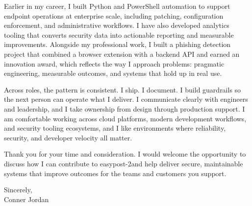\documentclass[letterpaper,11pt]{article}
\newcommand{\companyname}{easypost-2}
\begin{document}
\vspace{16pt}

Earlier in my career, I built Python and PowerShell automation to support endpoint operations at enterprise scale, including patching, configuration enforcement, and administrative workflows. I have also developed analytics tooling that converts security data into actionable reporting and measurable improvements. Alongside my professional work, I built a phishing detection project that combined a browser extension with a backend API and earned an innovation award, which reflects the way I approach problems: pragmatic engineering, measurable outcomes, and systems that hold up in real use.

\vspace{16pt}

Across roles, the pattern is consistent. I ship. I document. I build guardrails so the next person can operate what I deliver. I communicate clearly with engineers and leadership, and I take ownership from design through production support. I am comfortable working across cloud platforms, modern development workflows, and security tooling ecosystems, and I like environments where reliability, security, and developer velocity all matter.

\vspace{16pt}

Thank you for your time and consideration. I would welcome the opportunity to discuss how I can contribute to \companyname and help deliver secure, maintainable systems that improve outcomes for the teams and customers you support.

\vspace{16pt}

Sincerely,\\
Conner Jordan
\end{document}
